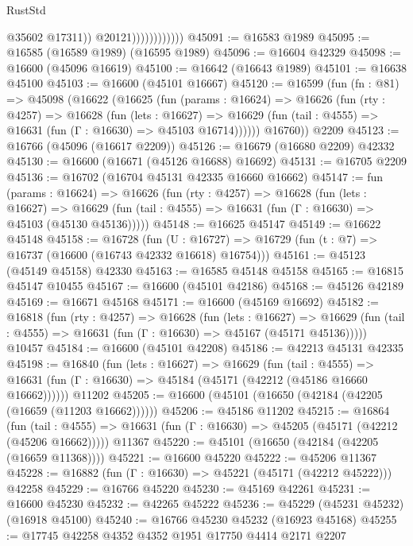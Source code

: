 \begin{lexlean}{RustStd}
\begin{coremodule}
{\begin{coremodule}
{{{{{{{{{{{{{{{{{{{{{{{{{{{{{{{{{{{{{{{{{{{{{{{{{{{{{{{                                @35602
                                @17311))
                            @20121))))))))))))
@45091 := @16583 @1989
@45095 := @16585 (@16589 @1989) (@16595 @1989)
@45096 := @16604 @42329
@45098 := @16600 (@45096 @16619)
@45100 := @16642 (@16643 @1989)
@45101 := @16638 @45100
@45103 := @16600 (@45101 @16667)
@45120 := @16599
    (fun (fn : @81) =>
    @45098
      (@16622
        (@16625
          (fun (params : @16624) =>
          @16626
            (fun (rty : @4257) =>
            @16628
              (fun (lets : @16627) =>
              @16629 (fun (tail : @4555) => @16631 (fun (Γ : @16630) => @45103 @16714))))))
        @16760))
    @2209
@45123 := @16766 (@45096 (@16617 @2209))
@45126 := @16679 (@16680 @2209) @42332
@45130 := @16600 (@16671 (@45126 @16688) @16692)
@45131 := @16705 @2209
@45136 := @16702 (@16704 @45131 @42335 @16660 @16662)
@45147 := fun (params : @16624) =>
  @16626
    (fun (rty : @4257) =>
    @16628
      (fun (lets : @16627) =>
      @16629 (fun (tail : @4555) => @16631 (fun (Γ : @16630) => @45103 (@45130 @45136)))))
@45148 := @16625 @45147
@45149 := @16622 @45148
@45158 := @16728
    (fun (U : @16727) => @16729 (fun (t : @7) => @16737 (@16600 (@16743 @42332 @16618) @16754)))
@45161 := @45123 (@45149 @45158) @42330
@45163 := @16585 @45148 @45158
@45165 := @16815 @45147 @10455
@45167 := @16600 (@45101 @42186)
@45168 := @45126 @42189
@45169 := @16671 @45168
@45171 := @16600 (@45169 @16692)
@45182 := @16818
    (fun (rty : @4257) =>
    @16628
      (fun (lets : @16627) =>
      @16629 (fun (tail : @4555) => @16631 (fun (Γ : @16630) => @45167 (@45171 @45136)))))
    @10457
@45184 := @16600 (@45101 @42208)
@45186 := @42213 @45131 @42335
@45198 := @16840
    (fun (lets : @16627) =>
    @16629
      (fun (tail : @4555) =>
      @16631 (fun (Γ : @16630) => @45184 (@45171 (@42212 (@45186 @16660 @16662))))))
    @11202
@45205 := @16600 (@45101 (@16650 (@42184 (@42205 (@16659 (@11203 @16662))))))
@45206 := @45186 @11202
@45215 := @16864
    (fun (tail : @4555) => @16631 (fun (Γ : @16630) => @45205 (@45171 (@42212 (@45206 @16662)))))
    @11367
@45220 := @45101 (@16650 (@42184 (@42205 (@16659 @11368))))
@45221 := @16600 @45220
@45222 := @45206 @11367
@45228 := @16882 (fun (Γ : @16630) => @45221 (@45171 (@42212 @45222))) @42258
@45229 := @16766 @45220
@45230 := @45169 @42261
@45231 := @16600 @45230
@45232 := @42265 @45222
@45236 := @45229 (@45231 @45232) (@16918 @45100)
@45240 := @16766 @45230 @45232 (@16923 @45168)
@45255 := @17745
    @42258
    @4352
    @4352
    @1951
    @17750
    @4414
    @2171
    @2207
}}}}}}}}}}}}}}}}}}}}}}}}}}}}}}}}}}}}}}}}}}}}}}}}}}}}}}}
\end{coremodule}}
\end{coremodule}
\end{lexlean}
